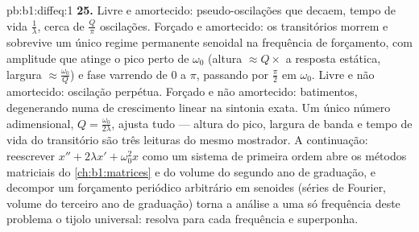 \begin{solution}{pb:b1:diffeq:1}
\textbf{25.} Livre e amortecido: pseudo-oscilações que decaem,
tempo de vida $\frac1\lambda$, cerca de $\frac Q\pi$ oscilações. Forçado e
amortecido: os transitórios morrem e sobrevive um único regime
permanente senoidal na frequência de forçamento, com amplitude que
atinge o pico perto de $\omega_0$ (altura $\approx Q \times$ a resposta estática,
largura $\approx
\frac{\omega_0}Q$) e fase varrendo de $0$ a $\pi$, passando por
$\frac\pi2$ em $\omega_0$. Livre e não amortecido: oscilação
perpétua. Forçado e não amortecido: batimentos, degenerando numa
 de crescimento linear na sintonia exata. Um único
número adimensional, $Q = \frac{\omega_0}{2\lambda}$, ajusta tudo ---
altura do pico, largura de banda e tempo de vida do transitório são três
leituras do mesmo mostrador. A continuação: reescrever $x'' + 2\lambda x' +
\omega_0^2x$ como um sistema de primeira ordem abre os métodos matriciais do
\cref{ch:b1:matrices} e do volume do segundo ano de graduação, e decompor um
forçamento periódico arbitrário em senoides (séries de Fourier, volume
do terceiro ano de graduação) torna a análise a uma só frequência deste
problema o tijolo universal: resolva para cada frequência e superponha.
\end{solution}
